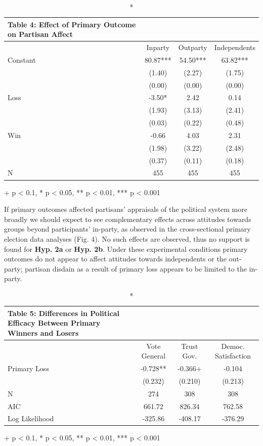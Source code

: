 \documentclass[
]{article}
\begin{document}
\captionsetup[table]{labelformat=empty,skip=1pt}
\begin{longtable}{lccc}
\caption*{
{\large \textbf{Table 4:} Effect of Primary Outcome on Partisan Affect}
} \\ 
\toprule
  & Inparty & Outparty & Independents \\ 
\midrule
Constant & 80.87*** & 54.50*** & 63.82*** \\ 
 & (1.40) & (2.27) & (1.75) \\ 
 & (0.00) & (0.00) & (0.00) \\ 
Loss & -3.50* & 2.42 & 0.14 \\ 
 & (1.93) & (3.13) & (2.41) \\ 
 & (0.03) & (0.22) & (0.48) \\ 
Win & -0.66 & 4.03 & 2.31 \\ 
 & (1.98) & (3.22) & (2.48) \\ 
 & (0.37) & (0.11) & (0.18) \\ 
N & 455 & 455 & 455 \\ 
 \bottomrule
\end{longtable}
\begin{minipage}{\linewidth}
+ p < 0.1, * p < 0.05, ** p < 0.01, *** p < 0.001\\ 
\end{minipage}

If primary outcomes affected partisans' appraisals of the political system more broadly we should expect to see complementary effects across attitudes towards groups beyond participants' in-party, as observed in the cross-sectional primary election data analyses (Fig. 4). No such effects are observed, thus no support is found for \textbf{Hyp. 2a} or \textbf{Hyp. 2b}. Under these experimental conditions primary outcomes do not appear to affect attitudes towards independents or the out-party; partisan disdain as a result of primary loss appears to be limited to the in-party.

\clearpage
\captionsetup[table]{labelformat=empty,skip=1pt}
\begin{longtable}{lccc}
\caption*{
{\large \textbf{Table 5:} Differences in Political Efficacy Between Primary Winners and Losers}
} \\ 
\toprule
  & Vote General & Trust Gov. & Democ. Satisfaction \\ 
\midrule
Primary Loss & -0.728** & -0.366+ & -0.104 \\ 
 & (0.232) & (0.210) & (0.213) \\ 
N & 274 & 308 & 308 \\ 
AIC & 661.72 & 826.34 & 762.58 \\ 
Log Likelihood & -325.86 & -408.17 & -376.29 \\ 
 \bottomrule
\end{longtable}
\begin{minipage}{\linewidth}
+ p < 0.1, * p < 0.05, ** p < 0.01, *** p < 0.001\\ 
\end{minipage}
\end{document}
